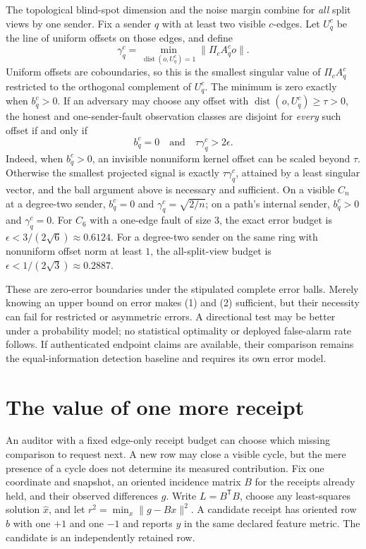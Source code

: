 \documentclass[11pt,a4paper]{article}
\begin{document}
The topological blind-spot dimension and the noise margin combine for \emph{all} split views by one sender. Fix a
sender $q$ with at least two visible $c$-edges. Let $U_q^c$ be the line of uniform offsets on those edges, and define
\[
\gamma_q^c=\min_{\operatorname{dist}(o,U_q^c)=1}\|\Pi_cA_q^c o\|.
\]
Uniform offsets are coboundaries, so this is the smallest singular value of $\Pi_cA_q^c$ restricted to the orthogonal
complement of $U_q^c$. The minimum is zero exactly when $b_q^c>0$. If an adversary may choose any offset with
$\operatorname{dist}(o,U_q^c)\ge\tau>0$, the honest and one-sender-fault observation classes are disjoint for
\emph{every} such offset if and only if
\[
b_q^c=0\quad\text{and}\quad\tau\gamma_q^c>2\epsilon.\tag{2}\label{eq:sender-noise}
\]
Indeed, when $b_q^c>0$, an invisible nonuniform kernel offset can be scaled beyond $\tau$. Otherwise the smallest
projected signal is exactly $\tau\gamma_q^c$, attained by a least singular vector, and the ball argument above is
necessary and sufficient. On a visible $C_n$ at a degree-two sender, $b_q^c=0$ and
$\gamma_q^c=\sqrt{2/n}$; on a path's internal sender, $b_q^c>0$ and $\gamma_q^c=0$.
For $C_6$ with a one-edge fault of size $3$, the exact error budget is $\epsilon<3/(2\sqrt6)\approx0.6124$.
For a degree-two sender on the same ring with nonuniform offset norm at least $1$, the all-split-view budget is
$\epsilon<1/(2\sqrt3)\approx0.2887$.

These are zero-error boundaries under the stipulated complete error balls. Merely knowing an upper bound on error
makes (1) and (2) sufficient, but their necessity can fail for restricted or asymmetric errors. A directional test may
be better under a probability model; no statistical optimality or deployed false-alarm rate follows. If authenticated
endpoint claims are available, their comparison remains the equal-information detection baseline and requires its own
error model.

\section{The value of one more receipt}\label{sec:active-audit}

An auditor with a fixed edge-only receipt budget can choose which missing comparison to request next. A new row may
close a visible cycle, but the mere presence of a cycle does not determine its measured contribution. Fix one
coordinate and snapshot, an oriented incidence matrix $B$ for the receipts already held, and their observed
differences $g$. Write $L=B^\mathsf{T}B$, choose any least-squares solution $\hat x$, and let
$r^2=\min_x\|g-Bx\|^2$. A candidate receipt has oriented row $b$ with one $+1$ and one $-1$ and reports $y$ in
the same declared feature metric. The candidate is an independently retained row.
\end{document}
